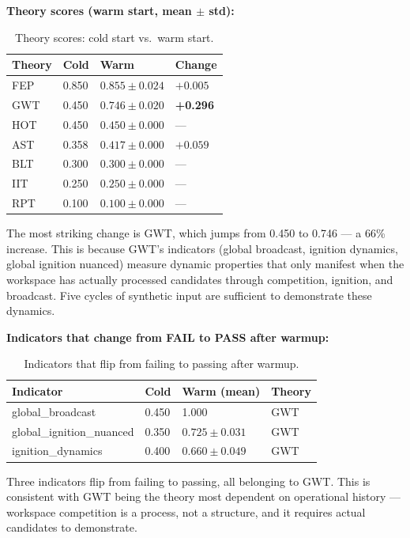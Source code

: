 \textbf{Theory scores (warm start, mean $\pm$ std):}

\begin{table}[t]
\centering
\begin{tabular}{llll}
\toprule
Theory & Cold & Warm & Change \\
\midrule
FEP & 0.850 & $0.855 \pm 0.024$ & $+0.005$ \\
GWT & 0.450 & $0.746 \pm 0.020$ & \textbf{+0.296} \\
HOT & 0.450 & $0.450 \pm 0.000$ & --- \\
AST & 0.358 & $0.417 \pm 0.000$ & $+0.059$ \\
BLT & 0.300 & $0.300 \pm 0.000$ & --- \\
IIT & 0.250 & $0.250 \pm 0.000$ & --- \\
RPT & 0.100 & $0.100 \pm 0.000$ & --- \\
\bottomrule
\end{tabular}
\caption{Theory scores: cold start vs.\ warm start.}
\label{tab:cold-warm-comparison}
\end{table}

The most striking change is GWT, which jumps from 0.450 to 0.746 --- a 66\% increase. This is because GWT's indicators (global broadcast, ignition dynamics, global ignition nuanced) measure dynamic properties that only manifest when the workspace has actually processed candidates through competition, ignition, and broadcast. Five cycles of synthetic input are sufficient to demonstrate these dynamics.

\textbf{Indicators that change from FAIL to PASS after warmup:}

\begin{table}[t]
\centering
\begin{tabular}{llll}
\toprule
Indicator & Cold & Warm (mean) & Theory \\
\midrule
global\_broadcast & 0.450 & 1.000 & GWT \\
global\_ignition\_nuanced & 0.350 & $0.725 \pm 0.031$ & GWT \\
ignition\_dynamics & 0.400 & $0.660 \pm 0.049$ & GWT \\
\bottomrule
\end{tabular}
\caption{Indicators that flip from failing to passing after warmup.}
\label{tab:flip-indicators}
\end{table}

Three indicators flip from failing to passing, all belonging to GWT. This is consistent with GWT being the theory most dependent on operational history --- workspace competition is a process, not a structure, and it requires actual candidates to demonstrate.

